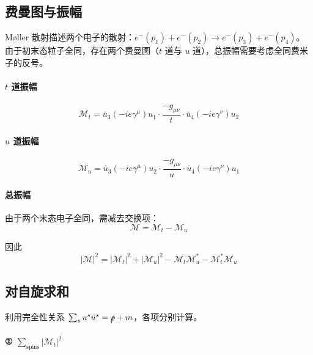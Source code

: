 
\subsection*{费曼图与振幅}

Møller 散射描述两个电子的散射：$e^-(p_1) + e^-(p_2) \to e^-(p_3) + e^-(p_4)$。
由于初末态粒子全同，存在两个费曼图（$t$ 道与 $u$ 道），总振幅需要考虑全同费米子的反号。

\paragraph{$t$ 道振幅}

\begin{equation}
    \mathcal{M}_t = \bar{u}_3 (-ie\gamma^\mu) u_1 \cdot \frac{-g_{\mu\nu}}{t} \cdot \bar{u}_4 (-ie\gamma^\nu) u_2
\end{equation}

\paragraph{$u$ 道振幅}

\begin{equation}
    \mathcal{M}_u = \bar{u}_3 (-ie\gamma^\mu) u_2 \cdot \frac{-g_{\mu\nu}}{u} \cdot \bar{u}_4 (-ie\gamma^\nu) u_1
\end{equation}

\paragraph{总振幅}

由于两个末态电子全同，需减去交换项：
\begin{equation}
    \mathcal{M} = \mathcal{M}_t - \mathcal{M}_u
\end{equation}

因此
\begin{equation}
    |\mathcal{M}|^2 = |\mathcal{M}_t|^2 + |\mathcal{M}_u|^2 - \mathcal{M}_t \mathcal{M}_u^* - \mathcal{M}_t^* \mathcal{M}_u
\end{equation}

\subsection*{对自旋求和}

利用完全性关系 $\sum_s u^s \bar{u}^s = \slashed{p} + m$，各项分别计算。

\paragraph{① $\sum_{\mathrm{spins}} |\mathcal{M}_t|^2$}

